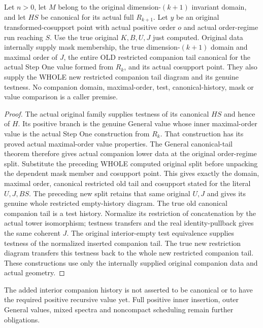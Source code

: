 \begin{theorem}
\label{hir:original-canonical-general-crossing-companion-data}
\leanok
{}
Let $n>0$, let $M$ belong to the original dimension-$(k+1)$ invariant
domain, and let $HS$ be canonical for its actual full $R_{k+1}$.
Let $y$ be an original transformed-cosupport point with actual positive
order $o$ and actual order-regime run reaching $S$.  Use the true original
$K,B,U,J$ just computed.  Original data internally supply mask membership,
the true dimension-$(k+1)$ domain and maximal order of $J$, the entire
OLD restricted companion tail canonical for the actual Step One value
formed from $R_k$, and its actual cosupport point.  They also supply the
WHOLE new restricted companion tail diagram and its genuine testness.
No companion domain, maximal-order, test, canonical-history, mask or value
comparison is a caller premise.
\end{theorem}
\begin{proof}
The actual original family supplies testness of its canonical $HS$ and
hence of $H$.  Its positive branch is the genuine General value whose
inner maximal-order value is the actual Step One construction from
$R_k$.  That construction has its proved actual maximal-order value
properties.  The General canonical-tail theorem therefore gives actual
companion lower data at the original order-regime split.  Substitute
the preceding WHOLE computed original split before unpacking the
dependent mask member and cosupport point.  This gives exactly the
domain, maximal order, canonical restricted old tail and cosupport
stated for the literal $U,J,BS$.  The preceding new split retains that
same original $U,J$ and gives its genuine whole restricted empty-history
diagram.  The true old canonical companion tail is a test history.
Normalize its restriction of concatenation by the actual tower
isomorphism; testness transfers and the real identity-pullback gives
the same coherent $J$.  The original interior-empty test equivalence
supplies testness of the normalized inserted companion tail.  The true
new restriction diagram transfers this testness back to the whole
new restricted companion tail.  These constructions use only the
internally supplied original companion data and actual geometry.
\end{proof}

The added interior companion history is not asserted to be canonical or
to have the required positive recursive value yet.  Full positive inner
insertion, outer General values, mixed spectra and noncompact scheduling
remain further obligations.
